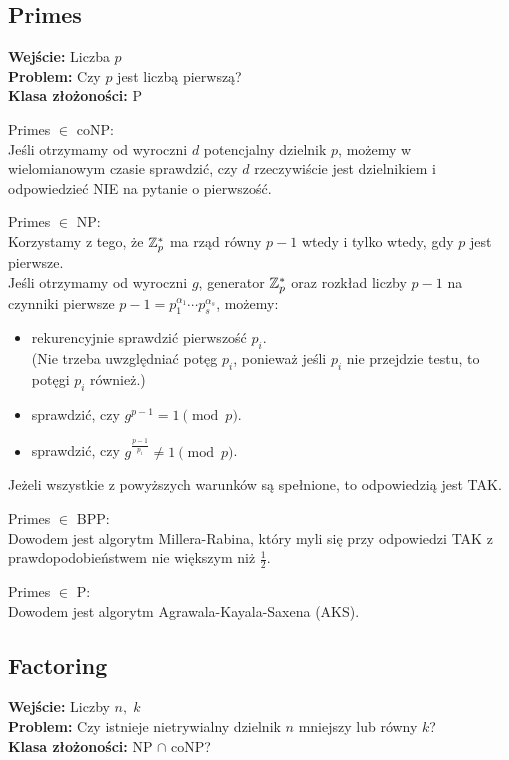 \subsection{Primes}
\textbf{Wejście:} Liczba \( p \) \\
\textbf{Problem:} Czy \( p \) jest liczbą pierwszą? \\
\textbf{Klasa złożoności:} P

Primes \( \in \) coNP: \\
Jeśli otrzymamy od wyroczni \( d \) potencjalny dzielnik \( p \), możemy w wielomianowym czasie sprawdzić, czy \( d \) rzeczywiście jest dzielnikiem i odpowiedzieć NIE na pytanie o pierwszość.

Primes \( \in \) NP: \\
Korzystamy z tego, że \( \mathbb{Z}_p^* \) ma rząd równy \( p-1 \) wtedy i tylko wtedy, gdy \( p \) jest pierwsze. \\
Jeśli otrzymamy od wyroczni \( g \), generator \( \mathbb{Z}_p^* \) oraz rozkład liczby \( p-1 \) na czynniki pierwsze \( p-1 = p_1^{\alpha_1} \cdots p_s^{\alpha_s} \), możemy:
\begin{itemize}
    \item rekurencyjnie sprawdzić pierwszość \( p_i \). \\
    (Nie trzeba uwzględniać potęg \( p_i \), ponieważ jeśli \( p_i \) nie przejdzie testu, to potęgi \( p_i \) również.)
    \item sprawdzić, czy \( g^{p-1} = 1 \pmod{p} \).
    \item sprawdzić, czy \( g^{\frac{p-1}{p_i}} \neq 1 \pmod{p} \).
\end{itemize}
Jeżeli wszystkie z powyższych warunków są spełnione, to odpowiedzią jest TAK.

\newpage
Primes \( \in \) BPP: \\
Dowodem jest algorytm Millera-Rabina, który myli się przy odpowiedzi TAK z prawdopodobieństwem nie większym niż \( \frac{1}{2} \).

Primes \( \in \) P: \\
Dowodem jest algorytm Agrawala-Kayala-Saxena (AKS).

\subsection{Factoring}
\textbf{Wejście:} Liczby \( n,\; k \) \\
\textbf{Problem:} Czy istnieje nietrywialny dzielnik \( n \) mniejszy lub równy \( k \)? \\
\textbf{Klasa złożoności:} NP \( \cap \) coNP?

